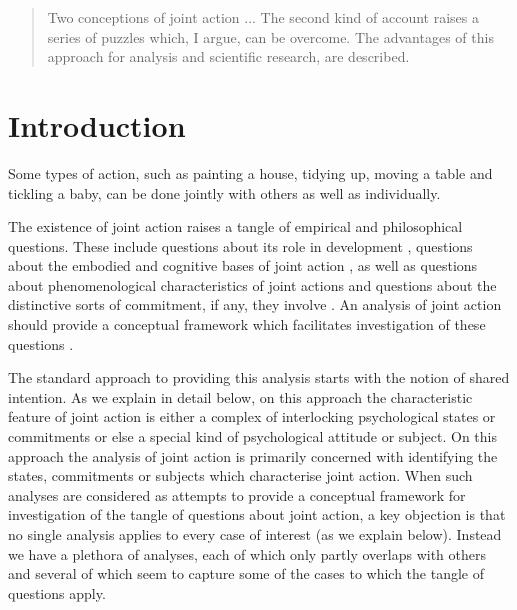 \documentclass[12pt,a4paper]{extarticle}
\begin{document}
\setlength\footnotesep{1em}


\maketitle

\begin{abstract}
Two conceptions of joint action ... The second kind of account raises a series of puzzles which, I argue, can be overcome.
The advantages of this approach for analysis and scientific research, are described.
\end{abstract}


\section{Introduction}
Some types of action, such as painting a house, tidying up, moving a table and tickling a baby, can be done jointly with others as well as individually.

The existence of joint action raises a tangle of empirical and philosophical questions.
These include 
 questions about its role in development \citep{Moll:2007gu,Hughes:2004zj,Brownell:2006gu}, 
 questions about the embodied and cognitive bases of joint action \citep{schmidt_understanding_2010,vesper_minimal_2010}, 
  as well as 
  questions about phenomenological characteristics of joint actions \citep{Pacherie:2010fk,seemann_why_2009}
  and questions about the distinctive sorts of commitment, if any, they involve \citep{gilbert_walking_1990,roth_shared_agency}.
An analysis of joint action should provide a conceptual framework which facilitates investigation of these questions \citep[p.\ 150]{Bratman:2009lv}.

The standard approach to providing this analysis starts with the notion of shared intention.
As we explain in detail below, on this approach the characteristic feature of joint action is either a complex of interlocking psychological states or commitments or else a special kind of psychological attitude or subject.
On this approach the analysis of joint action is primarily concerned with identifying the states, commitments or subjects which characterise joint action.
When such analyses are considered as attempts to provide a conceptual framework for investigation of the tangle of questions about joint action, a key objection is that no single analysis applies to every case of interest (as we explain below).
Instead we have a plethora of analyses, each of which only partly overlaps with others and several of which seem to capture some of the cases to which the tangle of questions apply.
\end{document}
